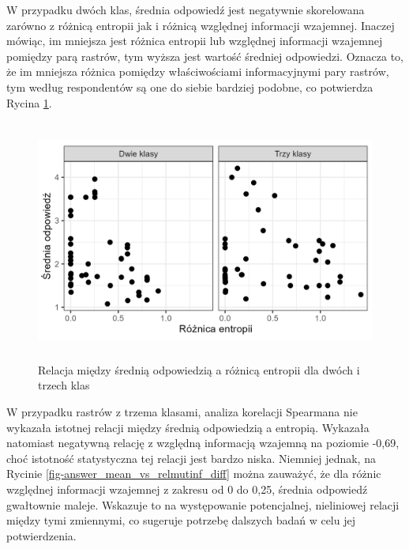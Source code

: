 \documentclass{amuthesis}
\begin{document}
W przypadku dwóch klas, średnia odpowiedź jest negatywnie skorelowana
zarówno z różnicą entropii jak i różnicą względnej informacji wzajemnej.
Inaczej mówiąc, im mniejsza jest różnica entropii lub względnej
informacji wzajemnej pomiędzy parą rastrów, tym wyższa jest wartość
średniej odpowiedzi. Oznacza to, że im mniejsza różnica pomiędzy
właściwościami informacyjnymi pary rastrów, tym według respondentów są
one do siebie bardziej podobne, co potwierdza Rycina
\ref{fig-answer_mean_vs_ent_diff}.

\begin{figure}[t]

{\centering \includegraphics[width=5.20833in,height=3.125in]{figures/answer_mean_vs_ent_diff.png}

}

\caption{\label{fig-answer_mean_vs_ent_diff}Relacja między średnią
odpowiedzią a różnicą entropii dla dwóch i trzech klas}

\end{figure}

W przypadku rastrów z trzema klasami, analiza korelacji Spearmana nie
wykazała istotnej relacji między średnią odpowiedzią a entropią.
Wykazała natomiast negatywną relację z względną informacją wzajemną na
poziomie -0,69, choć istotność statystyczna tej relacji jest bardzo
niska. Niemniej jednak, na Rycinie
\ref{fig-answer_mean_vs_relmutinf_diff} można zauważyć, że dla różnic
względnej informacji wzajemnej z zakresu od 0 do 0,25, średnia odpowiedź
gwałtownie maleje. Wskazuje to na występowanie potencjalnej, nieliniowej
relacji między tymi zmiennymi, co sugeruje potrzebę dalszych badań w
celu jej potwierdzenia.
\end{document}
